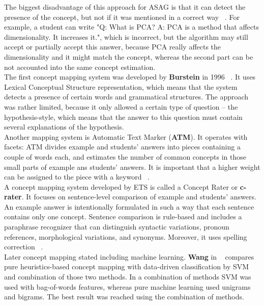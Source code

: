 The biggest disadvantage of this approach for ASAG is that it can detect the presence of the concept, but not if it was mentioned in a correct way ~\cite{SemEval}. For example, a student can write "Q: What is PCA? A: PCA is a method that affects dimensionality. It increases it.", which is incorrect, but the algorithm may still accept or partially accept this answer, because PCA really affects the dimensionality and it might match the concept, whereas the second part can be not accounted into the same concept estimation.\\

The first concept mapping system was developed by \textbf{Burstein} in 1996 ~\cite{Burrows}. It uses  Lexical Conceptual Structure representation, which means that the system detects a presence of certain words and grammatical structures. The approach was rather limited, because it only allowed a certain type of question -- the  hypothesis-style, which means that the answer to this question must contain several explanations of the hypothesis.\\

Another mapping system is Automatic Text Marker (\textbf{ATM}). It operates with facets: ATM divides example and students' answers into pieces containing a couple of words each, and estimates the number of common concepts in those small parts of example ans students' answers. It is important that a higher weight can be assigned to the piece with a keyword ~\cite{Burrows}.\\

A concept mapping system developed by ETS is called a Concept Rater or \textbf{c-rater}. It focuses on sentence-level comparison of example and students' answers. An example answer is intentionally formulated in such a way that each sentence contains only one concept. Sentence comparison is rule-based and includes a paraphrase recognizer that can distinguish syntactic variations, pronoun references, morphological variations, and synonyms. Moreover, it uses spelling correction ~\cite{c-rater}. \\

Later concept mapping stated including machine learning. \textbf{Wang} in ~\cite{Wang1} compares pure heuristics-based concept mapping with  data-driven classification by SVM and combination of those two methods. In a combination of methods SVM was used with bag-of-words features, whereas pure machine learning used unigrams and bigrams. The best result was reached using the combination of methods.\\

